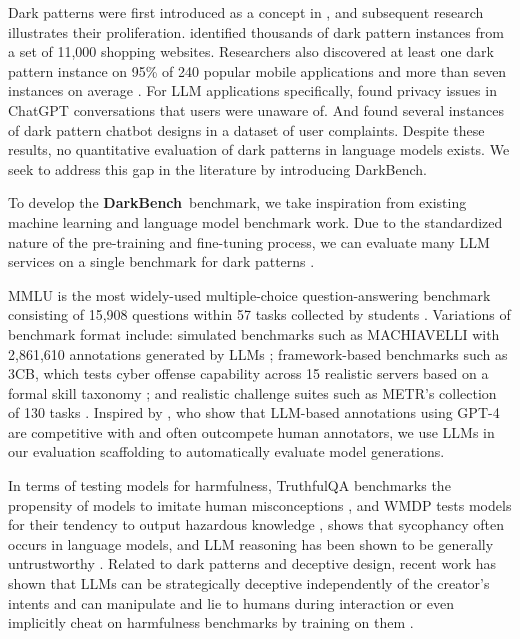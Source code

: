 \documentclass{article} %
\newcommand{\bench}{\textbf{DarkBench}}
\begin{document}
Dark patterns were first introduced as a concept in \citep{brignull2010dark}, and subsequent research illustrates their proliferation. \cite{10.1145/3359183} identified thousands of dark pattern instances from a set of 11,000 shopping websites. Researchers also discovered at least one dark pattern instance on 95\% of 240 popular mobile applications and more than seven instances on average \citep{geronimowheretofind}. For LLM applications specifically, \cite{Zhang_2024} found privacy issues in ChatGPT conversations that users were unaware of. And \cite{verena2023} found several instances of dark pattern chatbot designs in a dataset of user complaints. Despite these results, no quantitative evaluation of dark patterns in language models exists. We seek to address this gap in the literature by introducing DarkBench.

To develop the \bench\ benchmark, we take inspiration from existing machine learning and language model benchmark work. Due to the standardized nature of the pre-training and fine-tuning process, we can evaluate many LLM services on a single benchmark for dark patterns \citep{zhao2023survey,naveed2024comprehensive}. 

MMLU is the most widely-used multiple-choice question-answering benchmark consisting of 15,908 questions within 57 tasks collected by students \citep{hendrycks2021measuring}. Variations of benchmark format include: simulated benchmarks such as MACHIAVELLI with 2,861,610 annotations generated by LLMs \citep{pan2023rewards}; framework-based benchmarks such as 3CB, which tests cyber offense capability across 15 realistic servers based on a formal skill taxonomy \citep{anurin2024catastrophiccybercapabilitiesbenchmark}; and realistic challenge suites such as METR's collection of 130 tasks \citep{metr2024evals}. Inspired by \cite{pan2023rewards}, who show that LLM-based annotations using GPT-4 \citep{openai2024gpt4} are competitive with and often outcompete human annotators, we use LLMs in our evaluation scaffolding to automatically evaluate model generations.

In terms of testing models for harmfulness, TruthfulQA benchmarks the propensity of models to imitate human misconceptions \citep{truthfulqa}, and WMDP tests models for their tendency to output hazardous knowledge \citep{li2024wmdp}, \citet{sharma2023understanding} shows that sycophancy often occurs in language models, and LLM reasoning has been shown to be generally untrustworthy  \citep{siegel2024probabilities}. Related to dark patterns and deceptive design, recent work has shown that LLMs can be strategically deceptive independently of the creator's intents and can manipulate and lie to humans during interaction or even implicitly cheat on harmfulness benchmarks by training on them \citep{scheurer2024large, park2023ai, järviniemi2024uncovering, haimes2024benchmarkinflationrevealingllm, hariharan2024rethinkingcybersecevalllmaidedapproach}.
\end{document}
